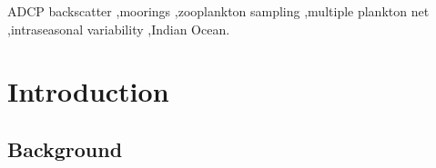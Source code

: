 \documentclass[authoryear,review,11pt]{elsarticle}
\begin{document}
\begin{frontmatter}
\begin{abstract}
	
\end{abstract}

\begin{keyword}
	ADCP backscatter \sep moorings \sep zooplankton sampling \sep multiple plankton net \sep intraseasonal variability \sep Indian Ocean.
\end{keyword}
\end{frontmatter}


\pagebreak


\linenumbers

\section{Introduction}
\label{sec:intro}

\subsection{Background}
\label{sec:intro.back}
\end{document}

